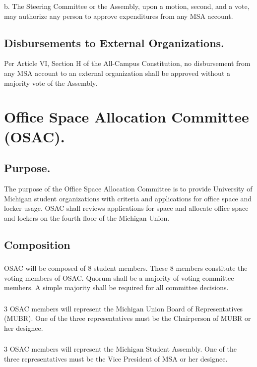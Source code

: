 b. 	The Steering Committee or the Assembly, upon a motion, second, and a vote, may authorize any person to approve expenditures from any MSA account.   

\subsection{Disbursements to External Organizations.}  Per Article VI, Section H of the All-Campus Constitution, no disbursement from any MSA account to an external organization shall be approved without a majority vote of the Assembly. 


\section{Office Space Allocation Committee (OSAC).}

\subsection{Purpose.}
The purpose of the Office Space Allocation Committee is to provide University of Michigan student organizations with criteria and applications for office space and locker usage.  OSAC shall reviews applications for space and allocate office space and lockers on the fourth floor of the Michigan Union. 

\subsection{Composition}

\subsubsection{}
OSAC will be composed of 8 student members.  These 8 members constitute the voting members of OSAC.  Quorum shall be a majority of voting committee members.  A simple majority shall be required for all committee decisions.

\subsubsection{}
3 OSAC members will represent the Michigan Union Board of Representatives (MUBR).  One of the three representatives must be the Chairperson of MUBR or her designee.

\subsubsection{}
3 OSAC members will represent the Michigan Student Assembly.  One of the three representatives must be the Vice President of MSA or her designee. 

